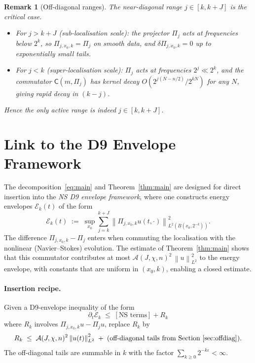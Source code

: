 \documentclass[11pt,a4paper]{article}
\newtheorem{remark}[theorem]{Remark}
\newcommand{\norm}[2]{\left\|#1\right\|_{#2}}
\newcommand{\comm}{\mathsf{C}}     %
\begin{document}
\begin{remark}[Off-diagonal ranges]
\label{rem:offdiag}
The near-diagonal range $j \in [k, k+J]$ is the critical case.
\begin{itemize}
  \item For $j > k+J$ (sub-localisation scale): the projector $\Pi_j$ acts
    at frequencies below $2^k$, so $\Pi_{j,x_0,k} = \Pi_j$ on smooth
    data, and $\delta\Pi_{j,x_0,k} = 0$ up to exponentially small tails.
  \item For $j < k$ (super-localisation scale): $\Pi_j$ acts at frequencies
    $2^j \ll 2^k$, and the commutator $\comm(m,\Pi_j)$ has kernel decay
    $O(2^{j(N-n/2)} / 2^{kN})$ for any $N$, giving rapid decay in $(k-j)$.
\end{itemize}
Hence the only active range is indeed $j \in [k, k+J]$.
\end{remark}

\section{Link to the D9 Envelope Framework}
\label{sec:d9link}

The decomposition~\eqref{eq:main} and Theorem~\ref{thm:main} are designed
for direct insertion into the \emph{NS D9 envelope framework}, where one
constructs energy envelopes $\mathcal{E}_{k}(t)$ of the form
\[
  \mathcal{E}_{k}(t)
  \;:=\; \sup_{x_0}\sum_{j=k}^{k+J}
         \norm{\Pi_{j,x_0,k} u(t,\cdot)}{L^2(B(x_0,2^{-k}))}^2.
\]
The difference $\Pi_{j,x_0,k} - \Pi_j$ enters when commuting the
localisation with the nonlinear (Navier--Stokes) evolution.  The estimate
of Theorem~\ref{thm:main} shows that this commutator contributes at most
$\mathcal{A}(J,\chi,n)^2\,\norm{u}{L^2}^2$ to the energy envelope, with
constants that are uniform in $(x_0, k)$, enabling a closed estimate.

\paragraph{Insertion recipe.}
Given a D9-envelope inequality of the form
\[
  \partial_t \mathcal{E}_k
  \;\leq\; [\text{NS terms}]
           + R_k
\]
where $R_k$ involves $\Pi_{j,x_0,k} u - \Pi_j u$, replace $R_k$ by
\[
  R_k \;\leq\; \mathcal{A}(J,\chi,n)^2 \norm{u(t)}{L^2}^2
  \;+\; \text{(off-diagonal tails from Section~\ref{sec:offdiag})}.
\]
The off-diagonal tails are summable in $k$ with the factor
$\sum_{k \geq 0} 2^{-k\varepsilon} < \infty$.
\end{document}
